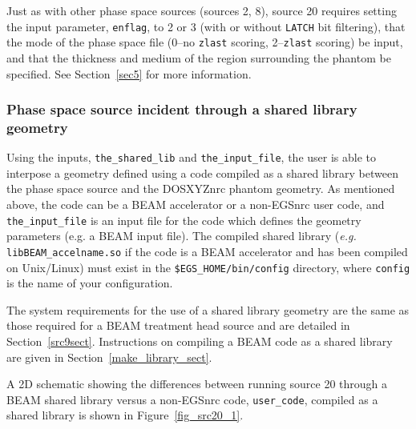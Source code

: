 \documentclass[12pt,twoside]{article}      %
\newcommand{\indexm}[1]{\index{#1}}
\begin{document}
Just as with other phase space sources (sources 2, 8), source 20 requires setting the input parameter, {\tt enflag}, to 2 or 3
(with or without {\tt LATCH} bit filtering), that the mode of the phase space file (0--no {\tt zlast} scoring, 2--{\tt zlast} scoring) be
input, and that the thickness and medium of the region surrounding the phantom be specified.  See Section~\ref{sec5} for more information.

\subsubsection{Phase space source incident through a shared library geometry}

\indexm{the\_shared\_lib}\indexm{the\_input\_file}
Using the inputs, {\tt the\_shared\_lib} and {\tt the\_input\_file}, the user is able to interpose
a geometry defined using a code compiled as a shared library between the phase space source and the DOSXYZnrc
phantom geometry.  As mentioned above, the code can be a BEAM accelerator or a non-EGSnrc user code, and
{\tt the\_input\_file} is an input file for the code which defines the geometry parameters (e.g. a BEAM input file).
The compiled shared library ({\it e.g.} {\tt libBEAM\_accelname.so} if the code is a BEAM accelerator and has been compiled
on Unix/Linux) must exist in the {\tt \$EGS\_HOME/bin/config} directory, where {\tt config} is the name of your
configuration.

The system requirements for the use of a shared library geometry are the same as those required for
a BEAM treatment head source and are detailed in Section~\ref{src9sect}.  Instructions on compiling
a BEAM code as a shared library are given in Section~\ref{make_library_sect}.

A 2D schematic showing the differences between running source 20 through a BEAM shared library versus a
non-EGSnrc code, {\tt user\_code}, compiled as a shared library is shown in Figure~\ref{fig_src20_1}.
\end{document}
